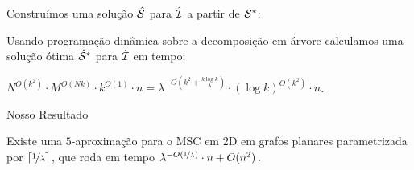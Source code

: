 \begin{frame}{}
    \centering
    Construímos uma solução {\color{red} $\hat {\mathcal{S}}$} para $\hat {\mathcal{I}}$ a partir de {\color{blue} $\mathcal{S}^*$}:

    \begin{minipage}{\linewidth}
        \vspace*{2cm}
        \centering
    \end{minipage}
\end{frame}

\begin{frame}{}
    Usando programação dinâmica sobre a decomposição em árvore calculamos uma solução ótima $\hat {\mathcal{S}}^*$ para $\hat{\mathcal{I}}$ em tempo:

    \bigskip
    \centering
    $N^{O(k^2)}\cdot M^{O(Nk)}\cdot k^{O(1)} \cdot n = \lambda^{-O(k^2+\frac{k\log k}{\lambda})}\cdot (\log k)^{O(k^2)}\cdot n$.
\end{frame}

\begin{frame}{Nosso Resultado}
  \begin{cor}
    Existe uma $5$-aproximação para o MSC em 2D em grafos planares parametrizada por $\lceil \nicefrac{1}{\lambda} \rceil$, que roda em tempo $\lambda^{-O(\nicefrac{1}{\lambda})} \cdot n + O(n^2)$.
  \end{cor}
\end{frame}

